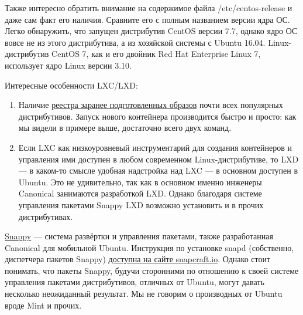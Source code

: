 \documentclass[14pt, a4paper]{article}
\begin{document}
Также интересно обратить внимание на содержимое файла /etc/centos-release и даже сам факт его
наличия. Сравните его с полным названием версии ядра ОС. Легко обнаружить, что запущен
дистрибутив CentOS версии 7.7, однако ядро ОС вовсе не из этого дистрибутива, а из хозяйской
системы с Ubuntu 16.04. Linux-дистрибутив CentOS 7, как и его двойник Red Hat Enterprise Linux 7,
использует ядро Linux версии 3.10.

Интересные особенности LXC/LXD:
\begin{enumerate}
    \item Наличие \href{https://images.linuxcontainers.org/}{реестра заранее подготовленных образов} почти всех популярных дистрибутивов.
    Запуск нового контейнера производится быстро и просто: как мы видели в примере выше,
    достаточно всего двух команд.
    \item Если LXC как низкоуровневый инструментарий для создания контейнеров и управления ими
    доступен в любом современном Linux-дистрибутиве, то LXD — в каком-то смысле удобная
    надстройка над LXC — в основном доступен в Ubuntu. Это не удивительно, так как в основном
    именно инженеры Canonical занимаются разработкой LXD. Однако благодаря системе
    управления пакетами Snappy LXD возможно установить и в прочих дистрибутивах.
\end{enumerate}

\href{https://ru.wikipedia.org/wiki/Snappy_(%D1%81%D0%B8%D1%81%D1%82%D0%B5%D0%BC%D0%B0_%D1%83%D0%BF%D1%80%D0%B0%D0%B2%D0%BB%D0%B5%D0%BD%D0%B8%D1%8F_%D0%BF%D0%B0%D0%BA%D0%B5%D1%82%D0%B0%D0%BC%D0%B8))}{Snappy} — система развёртки и управления пакетами, также разработанная Canonical для мобильной
Ubuntu. Инструкция по установке snapd (собственно, диспетчера пакетов Snappy) \href{https://snapcraft.io/docs/installing-snapd}{доступна на сайте
snapcraft.io}. Однако стоит понимать, что пакеты Snappy, будучи сторонними по отношению к своей
системе управления пакетами дистрибутивов, отличных от Ubuntu, могут давать несколько
неожиданный результат. Мы не говорим о производных от Ubuntu вроде Mint и прочих.
\end{document}
